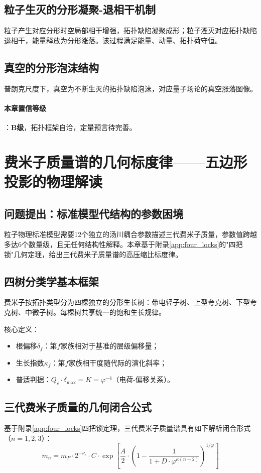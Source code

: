 \documentclass[12pt,a4paper,twocolumn]{article}
\renewcommand{\phi}{\varphi}
\begin{document}
\subsection{粒子生灭的分形凝聚-退相干机制}
粒子产生对应分形时空局部相干增强，拓扑缺陷凝聚成形；粒子湮灭对应拓扑缺陷退相干，能量释放为分形涨落。该过程满足能量、动量、拓扑荷守恒。

\subsection{真空的分形泡沫结构}
普朗克尺度下，真空为不断生灭的拓扑缺陷泡沫，对应量子场论的真空涨落图像。

\paragraph{本章置信等级}：\textbf{B级}，拓扑框架自洽，定量预言待完善。

\section{费米子质量谱的几何标度律——五边形投影的物理解读}
\label{sec:fermion_mass}

\subsection{问题提出：标准模型代结构的参数困境}
粒子物理标准模型需要12个独立的汤川耦合参数描述三代费米子质量，参数值跨越多达6个数量级，且无任何结构性解释。本章基于附录\ref{app:four_locks}的"四把锁"几何定理，给出三代费米子质量谱的高压缩比标度律。

\subsection{四树分类学基本框架}
费米子按拓扑类型分为四棵独立的分形生长树：带电轻子树、上型夸克树、下型夸克树、中微子树。每棵树共享统一的饱和生长规律。

核心定义：
\begin{itemize}
\item 根偏移$\delta_f$：第$f$家族相对于基准的层级偏移量；
\item 生长指数$\kappa_f$：第$f$家族相干度随代际的演化斜率；
\item 普适判据：$Q_c \cdot \delta_{\max} = K = \phi^{-4}$（电荷-偏移关系）。
\end{itemize}

\subsection{三代费米子质量的几何闭合公式}
基于附录\ref{app:four_locks}四把锁定理，三代费米子质量谱具有如下解析闭合形式（$n=1,2,3$）：
\[
m_n = m_P \cdot 2^{-\nu_e} \cdot C \cdot \exp\left[ \frac{A}{2} \cdot \left( 1 - \frac{1}{1 + D\cdot\phi^{\kappa(n-2)}} \right)^{1/\phi} \right]
\]
\end{document}

